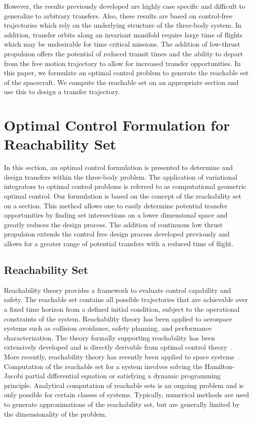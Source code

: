 \documentclass[preprint]{elsarticle}
\begin{document}
However, the results previously developed are highly case specific and difficult to generalize to arbitrary transfers.
Also, these results are based on control-free trajectories which rely on the underlying structure of the three-body system.
In addition, transfer orbits along an invariant manifold require large time of flights which may be undesirable for time critical missions.
The addition of low-thrust propulsion offers the potential of reduced transit times and the ability to depart from the free motion trajectory to allow for increased transfer opportunities. 
In this paper, we formulate an optimal control problem to generate the reachable set of the spacecraft.
We compute the reachable set on an appropriate \Poincare section and use this to design a transfer trajectory.

\section{Optimal Control Formulation for Reachability Set}
In this section, an optimal control formulation is presented to determine and design transfers within the three-body problem.
The application of variational integrators to optimal control problems is referred to as computational geometric optimal control.
Our formulation is based on the concept of the reachability set on a \Poincare section.
This method allows one to easily determine potential transfer opportunities by finding set intersections on a lower dimensional space and greatly reduces the design process.
The addition of continuous low thrust propulsion extends the control free design process developed previously and allows for a greater range of potential transfers with a reduced time of flight.

\subsection{Reachability Set}\label{sec:reachability_set}
Reachability theory provides a framework to evaluate control capability and safety.  
The reachable set contains all possible trajectories that are achievable over a fixed time horizon from a defined initial condition, subject to the operational constraints of the system.
Reachability theory has been applied to aerospace systems such as collision avoidance, safety planning, and performance characterization.
The theory formally supporting reachability has been extensively developed and is directly derivable from optimal control theory~\cite{varaiya2000,lygeros2002,lygeros2004}.
More recently, reachability theory has recently been applied to space systems~\cite{holzinger2009,komendera2012a}.
Computation of the reachable set for a system involves solving the Hamilton-Jacobi partial differential equation or satisfying a dynamic programming principle.
Analytical computation of reachable sets is an ongoing problem and is only possible for certain classes of systems.
Typically, numerical methods are used to generate approximations of the reachability set, but are generally limited by the dimensionality of the problem.
 
\end{document}
